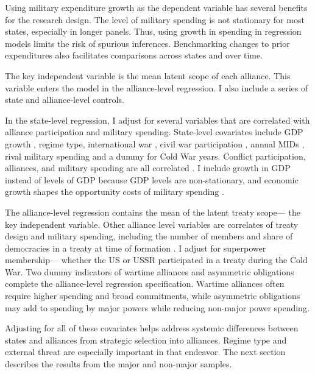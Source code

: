 \documentclass[12pt]{article}
\begin{document}
Using military expenditure growth as the dependent variable has several benefits for the research design. 
The level of military spending is not stationary for most states, especially in longer panels. 
Thus, using growth in spending in regression models limits the risk of spurious inferences.
Benchmarking changes to prior expenditures also facilitates comparisons across states and over time. 


The key independent variable is the mean latent scope of each alliance. 
This variable enters the model in the alliance-level regression. 
I also include a series of state and alliance-level controls. 


In the state-level regression, I adjust for several variables that are correlated with alliance participation and military spending. 
State-level covariates include GDP growth \citep{Boltetal2018}, regime type, international war \citep{Reiteretal2016}, civil war participation \citep{SarkeesWayman2010}, annual MIDs \citep{Gibleretal2016}, rival military spending \citep{ThompsonDreyer2012} and a dummy for Cold War years.
Conflict participation, alliances, and military spending are all correlated \citep{SeneseVasquez2008}. 
I include growth in GDP instead of levels of GDP because GDP levels are non-stationary, and economic growth shapes the opportunity costs of military spending \citep{Kimball2010, Zielinskietal2017}.


The alliance-level regression contains the mean of the latent treaty scope--- the key independent variable. 
Other alliance level variables are correlates of treaty design and military spending, including the number of members and share of democracies in a treaty at time of formation \citep{Chibaetal2015}.
I adjust for superpower membership--- whether the US or USSR participated in a treaty during the Cold War. 
Two dummy indicators of wartime alliances and asymmetric obligations \citep{Leedsetal2002} complete the alliance-level regression specification. 
Wartime alliances often require higher spending and broad commitments, while asymmetric obligations may add to spending by major powers while reducing non-major power spending. 


Adjusting for all of these covariates helps address systemic differences between states and alliances from strategic selection into alliances. 
Regime type and external threat are especially important in that endeavor. 
The next section describes the results from the major and non-major samples.
 
\end{document}

